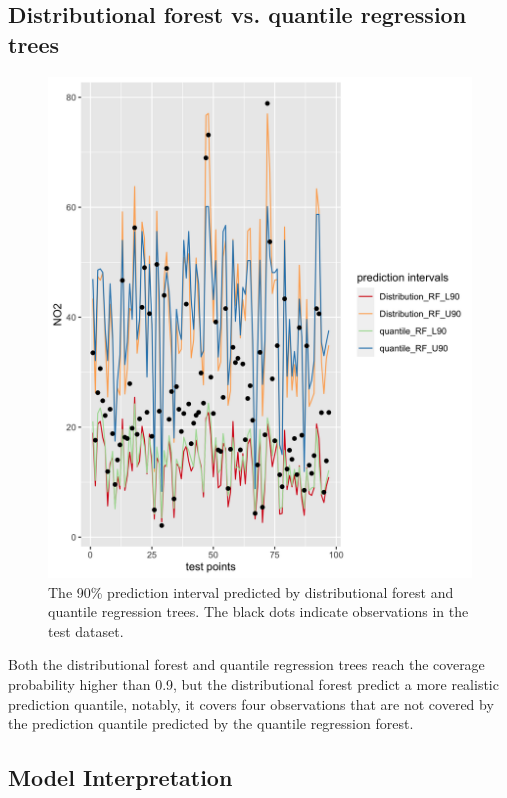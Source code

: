 \documentclass{article}
\begin{document}
\subsection{Distributional forest vs. quantile regression trees}
\begin{figure}
\centering
\includegraphics[scale = 0.2]{fig/dist_vs_qrf.png}
\caption{The 90\% prediction interval predicted by distributional forest and quantile regression trees. The black dots indicate observations in the test dataset.}
\label{distvsquant}
\end{figure}

Both the distributional forest and quantile regression trees reach the coverage probability higher than 0.9, but the distributional forest predict a more realistic prediction quantile, notably, it covers four observations that are not covered by the prediction quantile predicted by the quantile regression forest. 

\subsection{Model Interpretation} 
\end{document}
